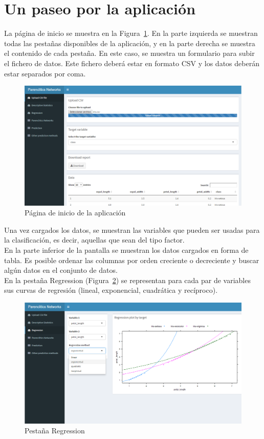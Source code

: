 \section{Un paseo por la aplicación}

La página de inicio se muestra en la Figura~\ref{fig:inicio}. En la parte izquierda se muestran todas las pestañas disponibles de la aplicación, y en la parte derecha se muestra el contenido de cada pestaña. En este caso, se muestra un formulario para subir el fichero de datos. Este fichero deberá estar en formato CSV y los datos deberán estar separados por coma.\\

\begin{figure}[tbph!]
	\centering
	\includegraphics[width=0.7\linewidth]{imagenes/inicio}
	\caption{Página de inicio de la aplicación}
	\label{fig:inicio}
\end{figure}

Una vez cargados los datos, se muestran las variables que pueden ser usadas para la clasificación, es decir, aquellas que sean del tipo factor.\\

En la parte inferior de la pantalla se muestran los datos cargados en forma de tabla. Es posible ordenar las columnas por orden creciente o decreciente y buscar algún datos en el conjunto de datos.\\

En la pestaña Regression (Figura~\ref{fig:regresion}) se representan para cada par de variables sus curvas de regresión (lineal, exponencial, cuadrática y recíproco). 

\begin{figure}[tbph!]
	\centering
	\includegraphics[width=0.7\linewidth]{imagenes/regresion}
	\caption{Pestaña Regression}
	\label{fig:regresion}
\end{figure}

